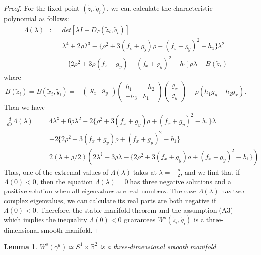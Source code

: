 \documentclass[11pt,reqno]{amsart}
\newtheorem{lemma}[theorem]{Lemma}
\begin{document}
\begin{proof}
For the fixed point $(\tilde{z}_i,\tilde{q}_i)$, we can calculate the characteristic polynomial as follows:
\begin{eqnarray}
\Lambda(\lambda)&:=&det[\lambda I-D_F(\tilde{z}_i,\tilde{q}_i)]\nonumber\\
&=&\lambda^4+2\rho\lambda^3-\{\rho^2+3(f_x+g_y)\rho+(f_x+g_y)^2-h_1\}\lambda^2\nonumber\\
&& -\{2\rho^2+3\rho(f_x+g_y)+(f_x+g_y)^2-h_1\}\rho\lambda -B(\tilde{z}_i)
\end{eqnarray}
where
$$
B(\tilde{z}_i)=B(\tilde{x}_i,\tilde{y}_i)=-
\begin{pmatrix}
g_x & g_y
\end{pmatrix}
\begin{pmatrix}
h_4 & -h_2 \\
-h_3 & h_1
\end{pmatrix}
\begin{pmatrix}
g_x\\ 
g_y
\end{pmatrix}
-\rho(h_1g_y-h_2g_x).
$$
Then we have
\begin{eqnarray}
\frac{d}{d\lambda}\Lambda(\lambda) &=& 4\lambda^3+6\rho\lambda^2-2\{\rho^2+3(f_x+g_y)\rho+(f_x+g_y)^2-h_1\}\lambda\nonumber\\
&&-2\{2\rho^2+3(f_x+g_y)\rho+(f_x+g_y)^2-h_1\}\nonumber\\
&=& 2(\lambda+\rho/2)(2\lambda^2+3\rho\lambda-\{2\rho^2+3(f_x+g_y)\rho+(f_x+g_y)^2-h_1\})\nonumber
\end{eqnarray}
Thus, one of the extremal values of $\Lambda(\lambda)$ takes at $\lambda=-\frac{\rho}{2}$, and we find that if $\Lambda(0)<0$, then the equation $\Lambda(\lambda)=0$ has three negative solutions and a positive solution when all eigenvalues are real numbers. The case $\Lambda(\lambda)$ has two complex eigenvalues, we can calculate its real parts are both negative if $\Lambda(0)<0$. Therefore, the stable manifold theorem \cite{Teschl} and the assumption (A3) which implies the inequality $\Lambda(0)<0$ guarantees $W^s(\tilde{z}_i,\tilde{q}_i)$ is a three-dimensional smooth manifold.

\end{proof}



\begin{lemma}\label{stable2}
$W^s(\gamma^u)\simeq S^1\times\mathbb{R}^2$ is a three-dimensional smooth manifold.
\end{lemma}
\end{document}
